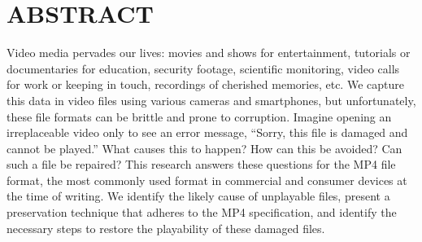 %
%
%
%
%

\chapter*{ABSTRACT}

\indent Video media pervades our lives: movies and shows for entertainment, tutorials or documentaries for education, security footage, scientific monitoring, video calls for work or keeping in touch, recordings of cherished memories, etc. We capture this data in video files using various cameras and smartphones, but unfortunately, these file formats can be brittle and prone to corruption. Imagine opening an irreplaceable video only to see an error message, ``Sorry, this file is damaged and cannot be played.'' What causes this to happen? How can this be avoided? Can such a file be repaired? This research answers these questions for the MP4 file format, the most commonly used format in commercial and consumer devices at the time of writing. We identify the likely cause of unplayable files, present a preservation technique that adheres to the MP4 specification, and identify the necessary steps to restore the playability of these damaged files.

%
%
%

\pagebreak{}